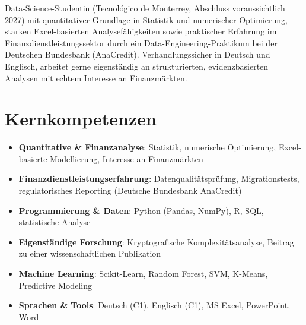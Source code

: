 \documentclass[11pt,a4paper,sans]{moderncv}
\begin{document}
\makecvtitle


\vspace{6pt}
\small{Data-Science-Studentin (Tecnológico de Monterrey, Abschluss voraussichtlich 2027) mit quantitativer Grundlage in Statistik und numerischer Optimierung, starken Excel-basierten Analysefähigkeiten sowie praktischer Erfahrung im Finanzdienstleistungssektor durch ein Data-Engineering-Praktikum bei der Deutschen Bundesbank (AnaCredit). Verhandlungssicher in Deutsch und Englisch, arbeitet gerne eigenständig an strukturierten, evidenzbasierten Analysen mit echtem Interesse an Finanzmärkten.}


\section{Kernkompetenzen}
\vspace{1pt}
\begin{itemize}

\item \textbf{Quantitative \& Finanzanalyse}: Statistik, numerische Optimierung, Excel-basierte Modellierung, Interesse an Finanzmärkten

\item \textbf{Finanzdienstleistungserfahrung}: Datenqualitätsprüfung, Migrationstests, regulatorisches Reporting (Deutsche Bundesbank AnaCredit)

\item \textbf{Programmierung \& Daten}: Python (Pandas, NumPy), R, SQL, statistische Analyse

\item \textbf{Eigenständige Forschung}: Kryptografische Komplexitätsanalyse, Beitrag zu einer wissenschaftlichen Publikation

\item \textbf{Machine Learning}: Scikit-Learn, Random Forest, SVM, K-Means, Predictive Modeling

\item \textbf{Sprachen \& Tools}: Deutsch (C1), Englisch (C1), MS Excel, PowerPoint, Word

\end{itemize}
\end{document}
